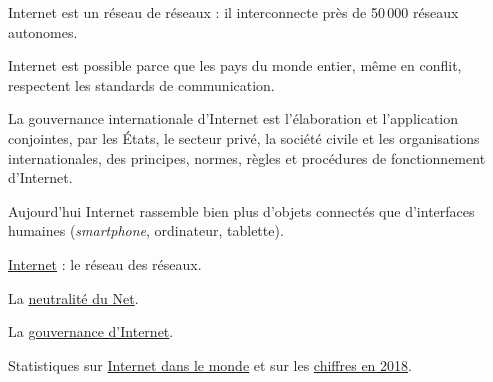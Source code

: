 \begin{jazzitemize}
\item Internet est un réseau de réseaux : il interconnecte près de 50\,000 réseaux autonomes.
\item Internet est possible parce que les pays du monde entier, même en conflit, respectent les standards de communication. 
\item La gouvernance internationale d'Internet est l’élaboration et l’application conjointes, par les États, le secteur privé, la société civile et les organisations internationales, des principes, normes, règles et procédures de fonctionnement d'Internet.
\item Aujourd'hui Internet rassemble bien plus d'objets connectés que d'interfaces humaines (\textit{smartphone}, ordinateur, tablette).
\end{jazzitemize}


\begin{jazzitemize}
\item \href{https://fr.wikipedia.org/wiki/Internet}{Internet} : le réseau des réseaux.
\item La \href{https://fr.wikipedia.org/wiki/Neutralit\%C3\%A9_du_r\%C3\%A9seau}{neutralité du Net}.
\item La \href{https://fr.wikipedia.org/wiki/Gouvernance_d\%27Internet}{gouvernance d'Internet}.
\item Statistiques sur \href{https://fr.wikipedia.org/wiki/Internet_dans_le_monde}{Internet dans le monde} et sur les \href{https://www.blogdumoderateur.com/chiffres-internet/}{chiffres en 2018}.
\end{jazzitemize}

